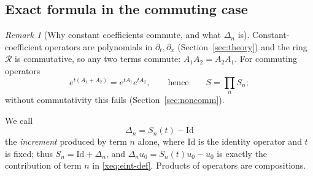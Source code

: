 \documentclass[11pt]{article}
\theoremstyle{plain}
\theoremstyle{definition}
\theoremstyle{remark}
\newtheorem{remark}[theorem]{Remark}
\newcommand{\ring}{\mathcal{R}}            %
\newcommand{\Id}{\mathrm{Id}}
\newenvironment{aside}[1]{\begin{remark}[#1]}{\end{remark}}
\begin{document}
\subsection{Exact formula in the commuting case}
\begin{aside}{Why constant coefficients commute, and what $\Delta_n$ is}
Constant-coefficient operators are polynomials in $\partial_t,\partial_x$ (Section~\ref{sec:theory}) and the ring $\ring$ is commutative, so any two terms commute: $A_1A_2=A_2A_1$. For commuting operators
\[
e^{t(A_1+A_2)}=e^{tA_1}e^{tA_2},\qquad\text{hence}\qquad S=\prod_nS_n;
\]
without commutativity this fails (Section~\ref{sec:noncomm}).

We call
\[
\Delta_n=S_n(t)-\Id
\]
the \emph{increment} produced by term $n$ alone, where $\Id$ is the identity operator and $t$ is fixed; thus $S_n=\Id+\Delta_n$, and $\Delta_nu_0=S_n(t)u_0-u_0$ is exactly the contribution of term $n$ in \eqref{xeq:eint-def}. Products of operators are compositions.
\end{aside}
\end{document}
